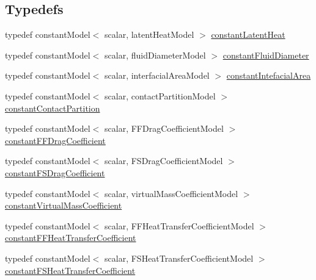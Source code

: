 \subsection*{Typedefs}
\begin{DoxyCompactItemize}
\item 
typedef constant\+Model$<$ scalar, latent\+Heat\+Model $>$ \hyperlink{namespaceFoam_af68e9abc0c6b136c3e34c66d816fb3a1}{constant\+Latent\+Heat}
\item 
typedef constant\+Model$<$ scalar, fluid\+Diameter\+Model $>$ \hyperlink{namespaceFoam_a9b1f75fec8c575083695f6c9e80234cf}{constant\+Fluid\+Diameter}
\item 
typedef constant\+Model$<$ scalar, interfacial\+Area\+Model $>$ \hyperlink{namespaceFoam_a67d7b55001a14e8c5b32e3548c7cbc73}{constant\+Intefacial\+Area}
\item 
typedef constant\+Model$<$ scalar, contact\+Partition\+Model $>$ \hyperlink{namespaceFoam_a52a37eca9ce7726c3c7b8c585ac45fec}{constant\+Contact\+Partition}
\item 
typedef constant\+Model$<$ scalar, F\+F\+Drag\+Coefficient\+Model $>$ \hyperlink{namespaceFoam_af1318ccc11265440ed0af331cb695819}{constant\+F\+F\+Drag\+Coefficient}
\item 
typedef constant\+Model$<$ scalar, F\+S\+Drag\+Coefficient\+Model $>$ \hyperlink{namespaceFoam_a45a431a6ad4bd9b4663987ce40f64f3e}{constant\+F\+S\+Drag\+Coefficient}
\item 
typedef constant\+Model$<$ scalar, virtual\+Mass\+Coefficient\+Model $>$ \hyperlink{namespaceFoam_a3ed635b90e17336f27203e329ff4691e}{constant\+Virtual\+Mass\+Coefficient}
\item 
typedef constant\+Model$<$ scalar, F\+F\+Heat\+Transfer\+Coefficient\+Model $>$ \hyperlink{namespaceFoam_a52ece67744a1564202ddbe77f715659e}{constant\+F\+F\+Heat\+Transfer\+Coefficient}
\item 
typedef constant\+Model$<$ scalar, F\+S\+Heat\+Transfer\+Coefficient\+Model $>$ \hyperlink{namespaceFoam_a1a8374d33d29cd2e004e8a98ac1f3d32}{constant\+F\+S\+Heat\+Transfer\+Coefficient}
\end{DoxyCompactItemize}

